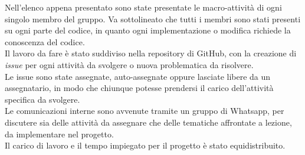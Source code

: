 Nell'elenco appena presentato sono state presentate le macro-attività di ogni singolo membro del gruppo. 
Va sottolineato che tutti i membri sono stati presenti su ogni parte del codice, in quanto ogni implementazione o modifica richiede
la conoscenza del codice.\\
Il lavoro da fare è stato suddiviso nella repository di GitHub, con la creazione di \emph{issue} per ogni attività 
da svolgere o nuova problematica da risolvere.\\
Le issue sono state assegnate, auto-assegnate oppure lasciate libere da un assegnatario, in modo che chiunque potesse 
prendersi il carico dell'attività specifica da svolgere.\\
Le comunicazioni interne sono avvenute tramite un gruppo di Whatsapp, per discutere sia delle attività da assegnare che 
delle tematiche affrontate a lezione, da implementare nel progetto.\\
Il carico di lavoro e il tempo impiegato per il progetto è stato equidistribuito.\\

 